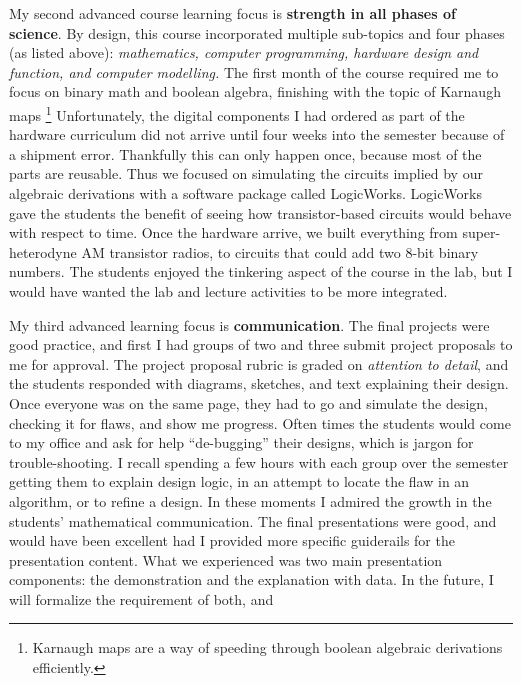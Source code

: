 \documentclass[../../../main.tex]{subfiles}
\begin{document}
My second advanced course learning focus is \textbf{strength in all phases of science}.  By design, this course incorporated multiple sub-topics and four phases (as listed above): \textit{mathematics, computer programming, hardware design and function, and computer modelling.}  The first month of the course required me to focus on binary math and boolean algebra, finishing with the topic of Karnaugh maps \footnote{Karnaugh maps are a way of speeding through boolean algebraic derivations efficiently.} Unfortunately, the digital components I had ordered as part of the hardware curriculum did not arrive until four weeks into the semester because of a shipment error.  Thankfully this can only happen once, because most of the parts are reusable.  Thus we focused on simulating the circuits implied by our algebraic derivations with a software package called LogicWorks.  LogicWorks gave the students the benefit of seeing how transistor-based circuits would behave with respect to time.  Once the hardware arrive, we built everything from super-heterodyne AM transistor radios, to circuits that could add two 8-bit binary numbers.  The students enjoyed the tinkering aspect of the course in the lab, but I would have wanted the lab and lecture activities to be more integrated.

My third advanced learning focus is \textbf{communication}.  The final projects were good practice, and first I had groups of two and three submit project proposals to me for approval.  The project proposal rubric is graded on \textit{attention to detail}, and the students responded with diagrams, sketches, and text explaining their design.  Once everyone was on the same page, they had to go and simulate the design, checking it for flaws, and show me progress.  Often times the students would come to my office and ask for help ``de-bugging'' their designs, which is jargon for trouble-shooting.  I recall spending a few hours with each group over the semester getting them to explain design logic, in an attempt to locate the flaw in an algorithm, or to refine a design.  In these moments I admired the growth in the students' mathematical communication.  The final presentations were good, and would have been excellent had I provided more specific guiderails for the presentation content.  What we experienced was two main presentation components: the demonstration and the explanation with data.  In the future, I will formalize the requirement of both, and 
\end{document}
